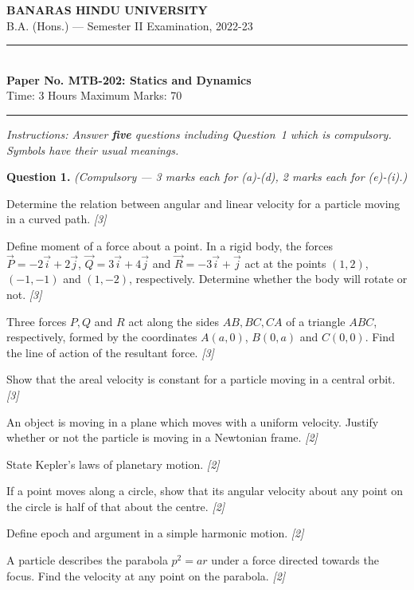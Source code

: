 \documentclass[11pt,a4paper]{article}
\newcommand{\pts}[1]{\hfill   \textit{[#1]}}
\begin{document}
\begin{center}
  {\large\bfseries BANARAS HINDU UNIVERSITY}\\[2pt]
  {\normalsize B.A. (Hons.) --- Semester II Examination, 2022-23}\\[6pt]
  \rule{0.8\linewidth}{0.5pt}\\[6pt]
  {\large\bfseries Paper No. MTB-202: Statics and Dynamics}\\[4pt]
  {\normalsize Time: 3 Hours \hfill Maximum Marks: 70}
\end{center}
\rule{\linewidth}{0.4pt}
\smallskip



\noindent   \textit{Instructions: Answer   \textbf{five} questions including Question~1 which is compulsory. Symbols have their usual meanings.}
\bigskip




\noindent   \textbf{Question 1.}   \textit{(Compulsory --- 3 marks each for (a)-(d), 2 marks each for (e)-(i).)}

\begin{parts}
  \item Determine the relation between angular and linear velocity for a particle moving in a curved path. \pts{3}
  \item Define moment of a force about a point. In a rigid body, the forces $\vec{P} = -2\vec{i} + 2\vec{j}$, $\vec{Q} = 3\vec{i} + 4\vec{j}$ and $\vec{R} = -3\vec{i} + \vec{j}$ act at the points $(1, 2)$, $(-1, -1)$ and $(1, -2)$, respectively. Determine whether the body will rotate or not. \pts{3}
  \item Three forces $P, Q$ and $R$ act along the sides $AB, BC, CA$ of a triangle $ABC$, respectively, formed by the coordinates $A(a, 0)$, $B(0, a)$ and $C(0, 0)$. Find the line of action of the resultant force. \pts{3}
  \item Show that the areal velocity is constant for a particle moving in a central orbit. \pts{3}
  \item An object is moving in a plane which moves with a uniform velocity. Justify whether or not the particle is moving in a Newtonian frame. \pts{2}
  \item State Kepler's laws of planetary motion. \pts{2}
  \item If a point moves along a circle, show that its angular velocity about any point on the circle is half of that about the centre. \pts{2}
  \item Define epoch and argument in a simple harmonic motion. \pts{2}
  \item A particle describes the parabola $p^2 = ar$ under a force directed towards the focus. Find the velocity at any point on the parabola. \pts{2}
\end{parts}
\end{document}
